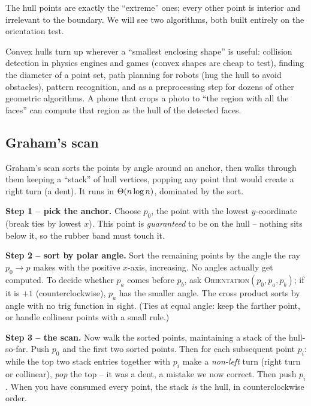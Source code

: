 The hull points are exactly the ``extreme'' ones; every other point is interior
and irrelevant to the boundary. We will see two algorithms, both built entirely
on the orientation test.

\begin{aestheticbox}
Convex hulls turn up wherever a ``smallest enclosing shape'' is useful: collision
detection in physics engines and games (convex shapes are cheap to test), finding
the diameter of a point set, path planning for robots (hug the hull to avoid
obstacles), pattern recognition, and as a preprocessing step for dozens of other
geometric algorithms. A phone that crops a photo to ``the region with all the
faces'' can compute that region as the hull of the detected faces.
\end{aestheticbox}

\subsection{Graham's scan}

Graham's scan sorts the points by angle around an anchor, then walks through them
keeping a ``stack'' of hull vertices, popping any point that would create a
right turn (a dent). It runs in $\Theta(n \log n)$, dominated by the sort.

\textbf{Step 1 -- pick the anchor.} Choose $p_0$, the point with the lowest
$y$-coordinate (break ties by lowest $x$). This point is \emph{guaranteed} to be
on the hull -- nothing sits below it, so the rubber band must touch it.

\textbf{Step 2 -- sort by polar angle.} Sort the remaining points by the angle
the ray $p_0 \to p$ makes with the positive $x$-axis, increasing. No angles
actually get computed. To decide whether $p_a$ comes before $p_b$, ask
\textsc{Orientation}$(p_0, p_a, p_b)$; if it is $+1$ (counterclockwise), $p_a$ has
the smaller angle. The cross product sorts by angle with no trig function in
sight. (Ties at equal angle: keep the farther point, or handle collinear points
with a small rule.)

\textbf{Step 3 -- the scan.} Now walk the sorted points, maintaining a stack of
the hull-so-far. Push $p_0$ and the first two sorted points. Then for each
subsequent point $p_i$: while the top two stack entries together with $p_i$ make a
\emph{non-left} turn (right turn or collinear), \emph{pop} the top -- it was a
dent, a mistake we now correct. Then push $p_i$. When you have consumed every
point, the stack \emph{is} the hull, in counterclockwise order.

